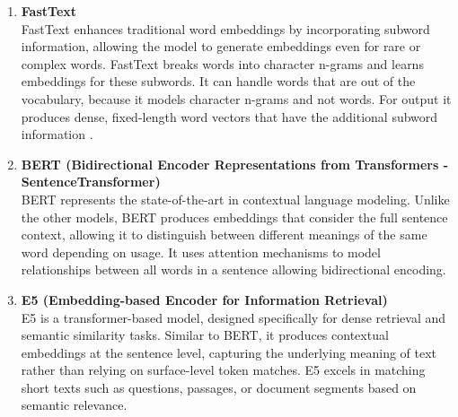 \documentclass[\myFontSize,a4paper,oneside,hidelinks]{article}
\begin{document}
\begin{enumerate}
\item \textbf{FastText}\\
FastText enhances traditional word embeddings by incorporating subword information, allowing the model to generate embeddings even for rare or complex words. FastText breaks words into character n-grams and learns embeddings for these subwords. It can handle words that are out of the vocabulary, because it models character n-grams and not words. For output it produces dense, fixed-length word vectors that have the additional subword information \cite{Yan2024}.


\item \textbf{BERT (Bidirectional Encoder Representations from Transformers - SentenceTransformer)}\\
BERT represents the state-of-the-art in contextual language modeling. Unlike the other models, BERT produces embeddings that consider the full sentence context, allowing it to distinguish between different meanings of the same word depending on usage. It uses attention mechanisms to model relationships between all words in a sentence allowing bidirectional encoding. \cite{Lim2025}

\item \textbf{E5 (Embedding-based Encoder for Information Retrieval)}\\
E5 is a transformer-based model, designed specifically for dense retrieval and semantic similarity tasks. Similar to BERT, it produces contextual embeddings at the sentence level, capturing the underlying meaning of text rather than relying on surface-level token matches. E5 excels in matching short texts such as questions, passages, or document segments based on semantic relevance.



\end{enumerate}
\end{document}
